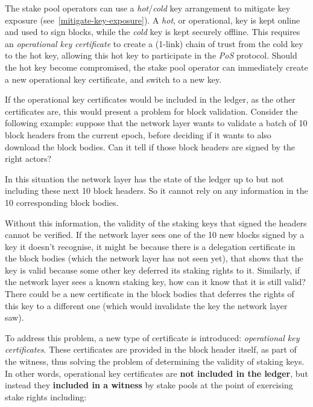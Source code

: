 \documentclass[11pt,a4paper]{article}
\begin{document}
The stake pool operators can use a \emph{hot}/\emph{cold} key
arrangement to mitigate key exposure
(see~\cref{mitigate-key-exposure}). A \emph{hot}, or operational, key
is kept online and used to sign blocks, while the \emph{cold} key is
kept securely offline. This requires an \emph{operational key
  certificate} to create a (1-link) chain of trust from the cold key
to the hot key, allowing this hot key to participate in the \emph{PoS}
protocol. Should the hot key become compromised, the stake pool
operator can immediately create a new operational key certificate, and
switch to a new key.

If the operational key certificates would be included in the ledger,
as the other certificates are, this would present a problem for block
validation. Consider the following example: suppose that the network
layer wants to validate a batch of 10 block headers from the current
epoch, before deciding if it wants to also download the block
bodies. Can it tell if those block headers are signed by the right
actors?

In this situation the network layer has the state of the ledger up to
but not including these next 10 block headers. So it cannot rely on
any information in the 10 corresponding block bodies.

Without this information, the validity of the staking keys that signed
the headers cannot be verified. If the network layer sees one of the
10 new blocks signed by a key it doesn't recognise, it might be
because there is a delegation certificate in the block bodies (which
the network layer has not seen yet), that shows that the key is valid
because some other key deferred its staking rights to it. Similarly,
if the network layer sees a known staking key, how can it know that it
is still valid? There could be a new certificate in the block bodies
that deferres the rights of this key to a different one (which would
invalidate the key the network layer saw).

To address this problem, a new type of certificate is introduced:
\emph{operational key certificates}. These certificates are provided
in the block header itself, as part of the witness, thus solving the
problem of determining the validity of staking keys. In other words,
operational key certificates are \textbf{not included in
  the ledger}, but instead they \textbf{included in a witness} by
stake pools at the point of exercising stake rights including:
\end{document}
